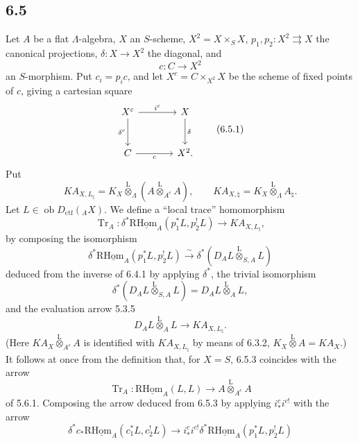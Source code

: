 \documentclass[11pt]{article}
\providecommand{\Tr}{\operatorname{Tr}}
\providecommand{\Tr}{\operatorname{Tr}}
\providecommand{\lten}{\overset{\mathrm L}{\otimes}}
\providecommand{\Ob}{\operatorname{ob}}
\providecommand{\Tr}{\operatorname{Tr}}
\providecommand{\lten}{\overset{\mathrm L}{\otimes}}
\providecommand{\lten}{\overset{\mathrm L}{\otimes}}
\providecommand{\Ob}{\operatorname{ob}}
\providecommand{\Tr}{\operatorname{Tr}}
\providecommand{\lten}{\overset{\mathrm L}{\otimes}}
\providecommand{\lten}{\overset{\mathrm L}{\otimes}}
\providecommand{\Ob}{\operatorname{Ob}}
\providecommand{\lten}{\overset{\mathrm L}{\otimes}}
\providecommand{\Tr}{\operatorname{Tr}}
\providecommand{\Ob}{\operatorname{ob}}
\providecommand{\Ob}{\operatorname{Ob}}
\providecommand{\lten}{\overset{\mathrm L}{\otimes}}
\begin{document}
\subsection*{6.5}
Let $A$ be a flat $\Lambda$-algebra, $X$ an $S$-scheme, $X^2=X\times_SX$, $p_1,p_2:X^2\rightrightarrows X$ the canonical projections, $\delta:X\to X^2$ the diagonal, and
\[
c:C\longrightarrow X^2
\]
an $S$-morphism. Put $c_i=p_ic$, and let $X^c=C\times_{X^2}X$ be the scheme of fixed points of $c$, giving a cartesian square
\begin{equation}
\begin{tikzcd}[column sep=large,row sep=large]
X^c \arrow[r,"i^c"] \arrow[d,"\delta^c"'] & X \arrow[d,"\delta"]\\
C \arrow[r,"c"'] & X^2 .
\end{tikzcd}
\tag{6.5.1}
\end{equation}
Put
\begin{equation}
KA_{X,L_{\natural}}=K_X\lten_{\Lambda}(A\lten_{A^e}A),
\qquad
KA_{X,\natural}=K_X\lten_{\Lambda}A_{\natural}.
\tag{6.5.2}
\end{equation}
Let $L\in\Ob D_{\mathrm{ctf}}({}_AX)$. We define a “local trace” homomorphism
\begin{equation}
\Tr_A:\delta^*\mathrm{R}\underline{\mathrm{Hom}}_A(p_1^*L,p_2^!L)
\longrightarrow
KA_{X,L_{\natural}},
\tag{6.5.3}
\end{equation}
by composing the isomorphism
\begin{equation}
\delta^*\mathrm{R}\underline{\mathrm{Hom}}_A(p_1^*L,p_2^!L)
\xrightarrow{\sim}
\delta^*(D_AL\lten_{S,A}L)
\tag{6.5.4}
\end{equation}
deduced from the inverse of 6.4.1 by applying $\delta^*$, the trivial isomorphism
\begin{equation}
\delta^*(D_AL\lten_{S,A}L)=D_AL\lten_AL,
\tag{6.5.5}
\end{equation}
and the evaluation arrow 5.3.5
\begin{equation}
D_AL\lten_AL\longrightarrow KA_{X,L_{\natural}}.
\tag{6.5.6}
\end{equation}
(Here $KA_X\lten_{A^e}A$ is identified with $KA_{X,L_{\natural}}$ by means of 6.3.2, $K_X\lten A=KA_X$.)
It follows at once from the definition that, for $X=S$, 6.5.3 coincides with the arrow
\[
\Tr_A:\mathrm{R}\underline{\mathrm{Hom}}_A(L,L)\longrightarrow A\lten_{A^e}A
\]
of 5.6.1. Composing the arrow deduced from 6.5.3 by applying $i_*^ci^{c!}$ with the arrow
\begin{equation}
\delta^*c_*\mathrm{R}\underline{\mathrm{Hom}}_A(c_1^*L,c_2^!L)
\longrightarrow
i_*^ci^{c!}\delta^*\mathrm{R}\underline{\mathrm{Hom}}_A(p_1^*L,p_2^!L)
\tag{6.5.7}
\end{equation}
\end{document}
